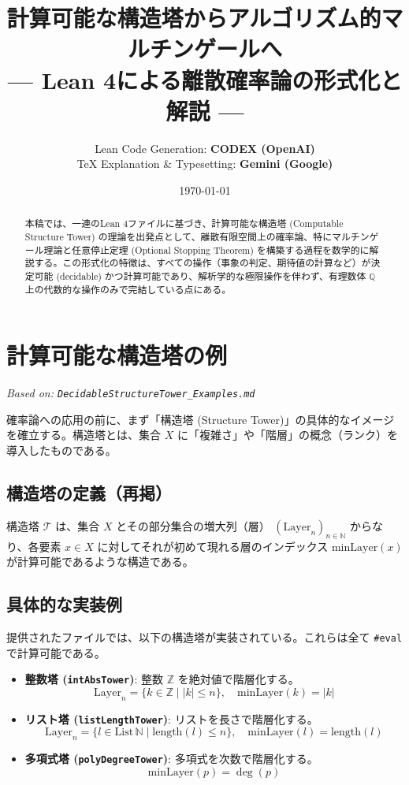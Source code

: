 \documentclass[a4paper,11pt]{ltjsarticle}
\title{\textbf{計算可能な構造塔からアルゴリズム的マルチンゲールへ} \\ \large --- Lean 4による離散確率論の形式化と解説 ---}
\author{
    Lean Code Generation: \textbf{CODEX (OpenAI)} \\
    TeX Explanation \& Typesetting: \textbf{Gemini (Google)}
}
\date{\today}
\theoremstyle{definition}
\newcommand{\N}{\mathbb{N}}
\newcommand{\Z}{\mathbb{Z}}
\newcommand{\Q}{\mathbb{Q}}
\newcommand{\Tower}{\mathcal{T}}
\newcommand{\Layer}[1]{\mathrm{Layer}_{#1}}
\newcommand{\MinLayer}{\mathrm{minLayer}}
\begin{document}
\maketitle

\begin{abstract}
本稿では、一連のLean 4ファイルに基づき、計算可能な構造塔 (Computable Structure Tower) の理論を出発点として、離散有限空間上の確率論、特にマルチンゲール理論と任意停止定理 (Optional Stopping Theorem) を構築する過程を数学的に解説する。この形式化の特徴は、すべての操作（事象の判定、期待値の計算など）が決定可能 (decidable) かつ計算可能であり、解析学的な極限操作を伴わず、有理数体 $\Q$ 上の代数的な操作のみで完結している点にある。
\end{abstract}

\tableofcontents
\newpage

\section{計算可能な構造塔の例}
\label{sec:tower_examples}
\textit{Based on: \texttt{DecidableStructureTower\_Examples.md}}

確率論への応用の前に、まず「構造塔 (Structure Tower)」の具体的なイメージを確立する。構造塔とは、集合 $X$ に「複雑さ」や「階層」の概念（ランク）を導入したものである。

\subsection{構造塔の定義（再掲）}
構造塔 $\Tower$ は、集合 $X$ とその部分集合の増大列（層） $(\Layer{n})_{n \in \N}$ からなり、各要素 $x \in X$ に対してそれが初めて現れる層のインデックス $\MinLayer(x)$ が計算可能であるような構造である。

\subsection{具体的な実装例}
提供されたファイルでは、以下の構造塔が実装されている。これらは全て \texttt{\#eval} で計算可能である。

\begin{itemize}
    \item \textbf{整数塔 (\texttt{intAbsTower})}:
    整数 $\Z$ を絶対値で階層化する。
    \[ \Layer{n} = \{k \in \Z \mid |k| \le n\}, \quad \MinLayer(k) = |k| \]
    
    \item \textbf{リスト塔 (\texttt{listLengthTower})}:
    リストを長さで階層化する。
    \[ \Layer{n} = \{l \in \text{List}\,\N \mid \text{length}(l) \le n\}, \quad \MinLayer(l) = \text{length}(l) \]
    
    \item \textbf{多項式塔 (\texttt{polyDegreeTower})}:
    多項式を次数で階層化する。
    \[ \MinLayer(p) = \deg(p) \]
\end{itemize}
\end{document}
